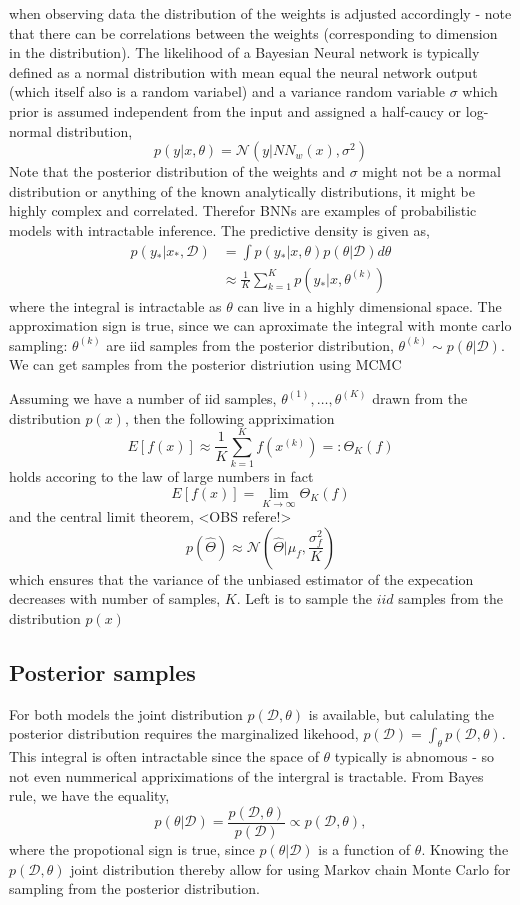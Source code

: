 when observing data the distribution of the weights is adjusted accordingly - note that 
there can be correlations between the weights (corresponding to dimension in the distribution). 
The likelihood of a Bayesian Neural network is typically defined as a normal distribution
with mean equal the neural network output (which itself also is a random variabel) and a 
variance random variable $\sigma$ which prior is assumed independent from the input and
assigned a half-caucy or log-normal distribution, 
$$p(y|x, \theta) = \mathcal{N}(y|NN_{w}(x),\sigma^2)$$
Note that the posterior distribution of the weights and $\sigma$ might not be a normal distribution
or anything of the known analytically distributions, it might be highly complex and correlated. 
Therefor BNNs are examples of probabilistic models with intractable inference. The predictive density is given as, 
\begin{align*}
    p(y_*|x_*,\mathcal{D}) &= \int p(y_*|x, \theta)p(\theta|\mathcal{D})d\theta\\
    &\approx \frac{1}{K} \sum_{k=1}^K p(y_*|x, \theta^{(k)})
\end{align*}
where the integral is intractable as $\theta$ can live in a highly dimensional space. The approximation sign
is true, since we can aproximate the integral with monte carlo sampling: $\theta^{(k)}$ are iid samples from the posterior 
distribution, $\theta^{(k)} \sim p(\theta|\mathcal{D})$. We can get samples from the posterior distriution using MCMC

\begin{testexample2}
    Assuming we have a number of iid samples, $\theta^{(1)}, \dots, \theta^{(K)}$ drawn from the
    distribution $p(x)$, then the following appriximation 
    $$E[f(x)] \approx \frac{1}{K} \sum_{k=1}^K f(x^{(k)}) =: \Theta_{K}(f)$$
    holds accoring to the law of large numbers 
    in fact $$E[f(x)] = \lim_{K \rightarrow \infty} \Theta_{K}(f)$$
    and the central limit theorem, <OBS refere!>
    $$p(\hat \Theta) \approx \mathcal{N}(\hat \Theta |\mu_f, \frac{\sigma_f^2}{K})$$
    which ensures that the variance of the unbiased estimator of the expecation decreases
    with number of samples, $K$. Left is to sample the $iid$ samples from the distribution $p(x)$
\end{testexample2}
\subsection*{Posterior samples}
For both models 
the joint distribution $p(\mathcal{D},\theta)$ is available, but calulating the posterior distribution requires the
marginalized likehood, $p(\mathcal{D}) = \int_{\theta} p(\mathcal{D},\theta)$. This integral is often intractable
since the space of $\theta$ typically is abnomous - so not even nummerical appriximations of the intergral is tractable.
From Bayes rule, we have the equality, 
$$p(\theta|\mathcal{D}) = \frac{p(\mathcal{D},\theta)}{p(\mathcal{D})} \propto p(\mathcal{D},\theta),$$
where the propotional sign is true, since $p(\theta|\mathcal{D})$ is a function of $\theta$. 
Knowing the $p(\mathcal{D},\theta)$ joint distribution thereby allow for using Markov chain Monte Carlo
for sampling from the posterior distribution.  

